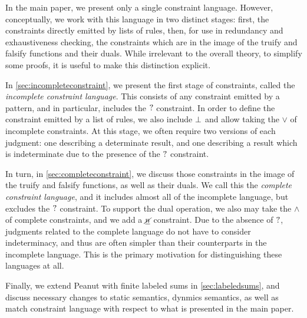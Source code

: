 \documentclass{article}
\begin{document}
In the main paper, we present only a single constraint language. However, conceptually, we work with this language in two distinct stages: first, the constraints directly emitted by lists of rules, then, for use in redundancy and exhaustiveness checking, the constraints which are in the image of the truify and falsify functions and their duals. While irrelevant to the overall theory, to simplify some proofs, it is useful to make this distinction explicit.

In \autoref{sec:incompleteconstraint}, we present the first stage of constraints, called the \emph{incomplete constraint language}. This consists of any constraint emitted by a pattern, and in particular, includes the $\mathtt{?}$ constraint. In order to define the constraint emitted by a list of rules, we also include $\bot$ and allow taking the $\vee$ of incomplete constraints. At this stage, we often require two versions of each judgment: one describing a determinate result, and one describing a result which is indeterminate due to the presence of the $\mathtt{?}$ constraint.

In turn, in \autoref{sec:completeconstraint}, we discuss those constraints in the image of the truify and falsify functions, as well as their duals. We call this the \emph{complete constraint language}, and it includes almost all of the incomplete language, but excludes the $\mathtt{?}$ constraint. To support the dual operation, we also may take the $\wedge$ of complete constraints, and we add a $\underline{\cancel{n}}$ constraint. Due to the absence of $\mathtt{?}$, judgments related to the complete language do not have to consider indeterminacy, and thus are often simpler than their counterparts in the incomplete language. This is the primary motivation for distinguishing these languages at all.

Finally, we extend Peanut with finite labeled sums in
\autoref{sec:labeledsums}, and discuss necessary changes to static
semantics, dynmics semantics, as well as match constraint language with
respect to what is presented in the main paper.



\pagebreak



\pagebreak

\end{document}
